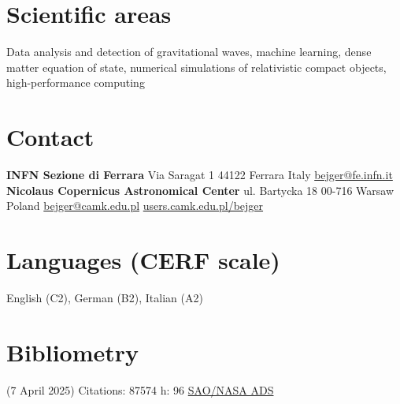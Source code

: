 \documentclass[]{friggeri-cv} %
\begin{document}


\begin{aside} %
\section{Scientific areas} 
Data analysis and detection of gravitational waves, machine learning, dense matter equation of state, numerical simulations of relativistic compact objects, high-performance computing 
~
\section{Contact}
{\bf INFN Sezione di Ferrara}
Via Saragat 1
44122 Ferrara
Italy
\href{mailto:bejger@fe.infn.it}{bejger@fe.infn.it}
~
{\bf Nicolaus Copernicus Astronomical Center} 
ul. Bartycka 18
00-716 Warsaw 
Poland
\href{mailto:bejger@camk.edu.pl}{bejger@camk.edu.pl}
\href{http://users.camk.edu.pl/bejger}{users.camk.edu.pl/bejger}
~
\section{Languages {\small (CERF scale)}}
English (C2), German (B2), Italian (A2)
\section{Bibliometry} 
{\small (7 April 2025)}
Citations: 87574
h: 96 
\href{https://ui.adsabs.harvard.edu/search/q=author\%3A\%22Bejger\%2C\%20M.\%22&sort=date\%20desc\%2C\%20bibcode\%20desc&p_=0}{SAO/NASA ADS}
\end{aside}
\end{document}

